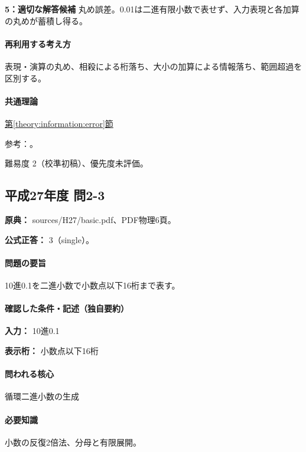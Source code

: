 \noindent\textbf{5：適切な解答候補} 丸め誤差。0.01は二進有限小数で表せず、入力表現と各加算の丸めが蓄積し得る。\par

\paragraph{再利用する考え方} 表現・演算の丸め、相殺による桁落ち、大小の加算による情報落ち、範囲超過を区別する。

\paragraph{共通理論} \hyperref[theory:information:error]{第\ref*{theory:information:error}節}

\par 参考：\cite{goldberg1991}。

\par 難易度 2（校準初稿）、優先度未評価。

\subsection{平成27年度 問2-3}
\label{q:h27-reg-basic-2-3}

\noindent\textbf{原典：} sources/H27/basic.pdf、PDF物理6頁。

\textbf{公式正答：} 3（single）。

\paragraph{問題の要旨} 10進0.1を二進小数で小数点以下16桁まで表す。

\paragraph{確認した条件・記述（独自要約）}\mbox{}\par

\noindent\textbf{入力：} 10進0.1\par

\noindent\textbf{表示桁：} 小数点以下16桁\par

\paragraph{問われる核心} 循環二進小数の生成

\paragraph{必要知識} 小数の反復2倍法、分母と有限展開。

